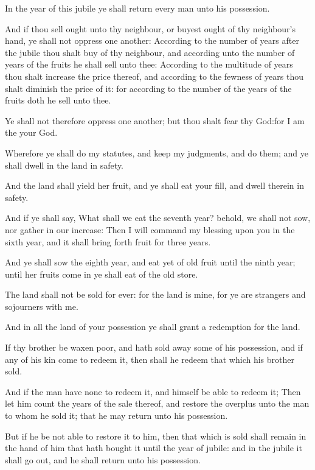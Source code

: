 \Verse In the year of this jubile ye shall return every man unto his possession.

\Verse And if thou sell ought unto thy neighbour, or buyest ought of thy neighbour's hand, ye shall not oppress one another: \Verse According to the number of years after the jubile thou shalt buy of thy neighbour, and according unto the number of years of the fruits he shall sell unto thee: \Verse According to the multitude of years thou shalt increase the price thereof, and according to the fewness of years thou shalt diminish the price of it: for according to the number of the years of the fruits doth he sell unto thee.

\Verse Ye shall not therefore oppress one another; but thou shalt fear thy God:for I am the \LORD your God.

\Verse Wherefore ye shall do my statutes, and keep my judgments, and do them; and ye shall dwell in the land in safety.

\Verse And the land shall yield her fruit, and ye shall eat your fill, and dwell therein in safety.

\Verse And if ye shall say, What shall we eat the seventh year? behold, we shall not sow, nor gather in our increase: \Verse Then I will command my blessing upon you in the sixth year, and it shall bring forth fruit for three years.

\Verse And ye shall sow the eighth year, and eat yet of old fruit until the ninth year; until her fruits come in ye shall eat of the old store.

\Verse The land shall not be sold for ever: for the land is mine, for ye are strangers and sojourners with me.

\Verse And in all the land of your possession ye shall grant a redemption for the land.

\Verse If thy brother be waxen poor, and hath sold away some of his possession, and if any of his kin come to redeem it, then shall he redeem that which his brother sold.

\Verse And if the man have none to redeem it, and himself be able to redeem it; \Verse Then let him count the years of the sale thereof, and restore the overplus unto the man to whom he sold it; that he may return unto his possession.

\Verse But if he be not able to restore it to him, then that which is sold shall remain in the hand of him that hath bought it until the year of jubile: and in the jubile it shall go out, and he shall return unto his possession.

